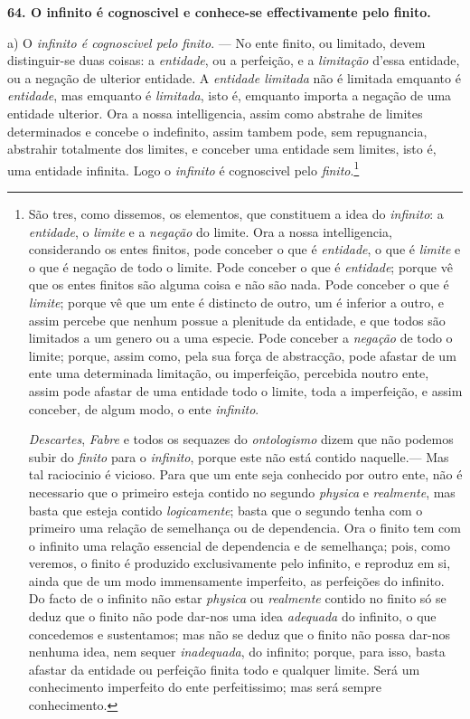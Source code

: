 \textbf{64. O infinito é cognoscivel e conhece-se effectivamente pelo finito.}

a) O \emph{infinito é cognoscivel pelo finito}. --- No ente finito, ou limitado, devem distinguir-se duas coisas: a \emph{entidade}, ou a perfeição, e a \emph{limitação} d'essa entidade, ou a negação de ulterior entidade. A \emph{entidade limitada} não é limitada emquanto é \emph{entidade}, mas emquanto é \emph{limitada}, isto é, emquanto importa a negação de uma entidade ulterior. Ora a nossa intelligencia, assim como abstrahe de limites determinados e concebe o indefinito, assim tambem pode, sem repugnancia, abstrahir totalmente dos limites, e conceber uma entidade sem limites, isto é, uma entidade infinita. Logo o \emph{infinito} é cognoscivel pelo \emph{finito}.\footnote{São tres, como dissemos, os elementos, que constituem a idea do \emph{infinito}: a \emph{entidade}, o \emph{limite} e a \emph{negação} do limite. Ora a nossa intelligencia, considerando os entes finitos, pode conceber o que é \emph{entidade}, o que é \emph{limite} e o que é negação de todo o limite. Pode conceber o que é \emph{entidade}; porque vê que os entes finitos são alguma coisa e não são nada. Pode conceber o que é \emph{limite}; porque vê que um ente é distincto de outro, um é inferior a outro, e assim percebe que nenhum possue a plenitude da entidade, e que todos são limitados a um genero ou a uma especie. Pode conceber a \emph{negação} de todo o limite; porque, assim como, pela sua força de abstracção, pode afastar de um ente uma determinada limitação, ou imperfeição, percebida noutro ente, assim pode afastar de uma entidade todo o limite, toda a imperfeição, e assim conceber, de algum modo, o ente \emph{infinito}.\par \emph{Descartes}, \emph{Fabre} e todos os sequazes do \emph{ontologismo} dizem que não podemos subir do \emph{finito} para o \emph{infinito}, porque este não está contido naquelle.--- Mas tal raciocinio é vicioso. Para que um ente seja conhecido por outro ente, não é necessario que o primeiro esteja contido no segundo \emph{physica} e \emph{realmente}, mas basta que esteja contido \emph{logicamente}; basta que o segundo tenha com o primeiro uma relação de semelhança ou de dependencia. Ora o finito tem com o infinito uma relação essencial de dependencia e de semelhança; pois, como veremos, o finito é produzido exclusivamente pelo infinito, e reproduz em si, ainda que de um modo immensamente imperfeito, as perfeições do infinito. Do facto de o infinito não estar \emph{physica} ou \emph{realmente} contido no finito só se deduz que o finito não pode dar-nos uma idea \emph{adequada} do infinito, o que concedemos e sustentamos; mas não se deduz que o finito não possa dar-nos nenhuma idea, nem sequer \emph{inadequada}, do infinito; porque, para isso, basta afastar da entidade ou perfeição finita todo e qualquer limite. Será um conhecimento imperfeito do ente perfeitissimo; mas será sempre conhecimento.}

